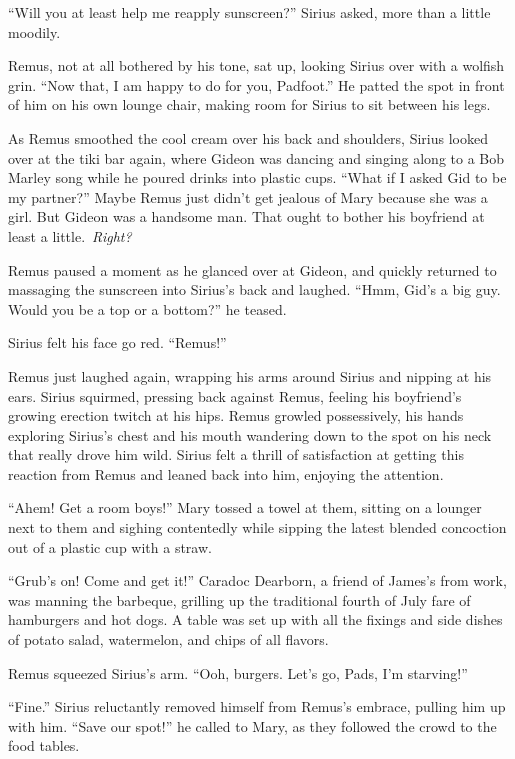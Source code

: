 \documentclass[12pt,twoside,openright]{memoir}
\begin{document}
``Will you at least help me reapply sunscreen?'' Sirius asked, more than a little moodily. 

Remus, not at all bothered by his tone, sat up, looking Sirius over with a wolfish grin. ``Now that, I am happy to do for you, Padfoot.'' He patted the spot in front of him on his own lounge chair, making room for Sirius to sit between his legs. 

As Remus smoothed the cool cream over his back and shoulders, Sirius looked over at the tiki bar again, where Gideon was dancing and singing along to a Bob Marley song while he poured drinks into plastic cups. ``What if I asked Gid to be my partner?'' Maybe Remus just didn't get jealous of Mary because she was a girl. But Gideon was a handsome man. That ought to bother his boyfriend at least a little.\ \textit{Right?}

Remus paused a moment as he glanced over at Gideon, and quickly returned to massaging the sunscreen into Sirius's back and laughed. ``Hmm, Gid's a big guy. Would you be a top or a bottom?'' he teased.

Sirius felt his face go red. ``Remus!''

Remus just laughed again, wrapping his arms around Sirius and nipping at his ears. Sirius squirmed, pressing back against Remus, feeling his boyfriend's growing erection twitch at his hips. Remus growled possessively, his hands exploring Sirius's chest and his mouth wandering down to the spot on his neck that really drove him wild. Sirius felt a thrill of satisfaction at getting this reaction from Remus and leaned back into him, enjoying the attention.

``Ahem! Get a room boys!'' Mary tossed a towel at them, sitting on a lounger next to them and sighing contentedly while sipping the latest blended concoction out of a plastic cup with a straw. 

``Grub's on! Come and get it!'' Caradoc Dearborn, a friend of James's from work, was manning the barbeque, grilling up the traditional fourth of July fare of hamburgers and hot dogs. A table was set up with all the fixings and side dishes of potato salad, watermelon, and chips of all flavors. 

Remus squeezed Sirius's arm. ``Ooh, burgers. Let's go, Pads, I'm starving!''

``Fine.'' Sirius reluctantly removed himself from Remus's embrace, pulling him up with him. ``Save our spot!'' he called to Mary, as they followed the crowd to the food tables.
\end{document}
